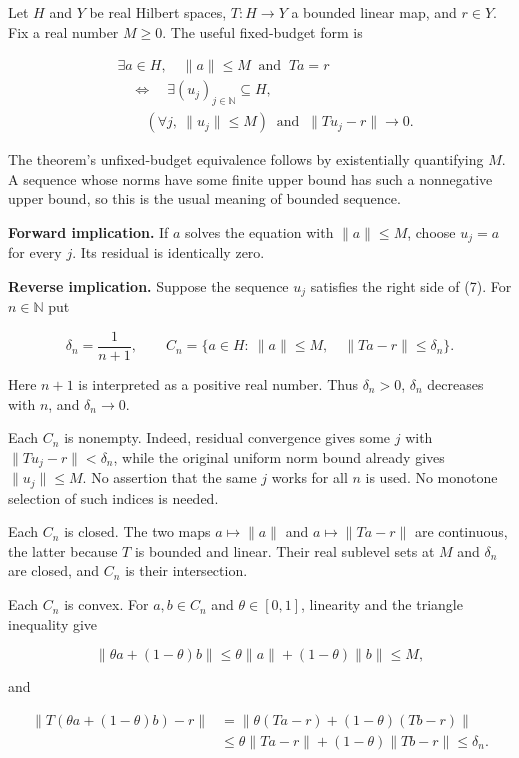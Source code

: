 \documentclass[11pt]{article}
\begin{document}
Let \(H\) and \(Y\) be real Hilbert spaces, \(T : H \to Y\) a bounded
linear map, and \(r \in Y\). Fix a real number \(M \ge 0\). The useful
fixed-budget form is

\[
\begin{aligned}
&\exists a\in H,\quad \|a\|\le M\ \text{ and }\ Ta=r\\
&\quad\Longleftrightarrow\quad
\exists (u_j)_{j\in\mathbb N}\subseteq H,\\
&\qquad
 (\forall j,\ \|u_j\|\le M)
 \ \text{ and }\ \|Tu_j-r\|\longrightarrow0.       
\end{aligned}
\tag{7}\]

The theorem's unfixed-budget equivalence follows by existentially
quantifying \(M\). A sequence whose norms have some finite upper bound
has such a nonnegative upper bound, so this is the usual meaning of
bounded sequence.

\textbf{Forward implication.} If \(a\) solves the equation with
\(\|a\| \le M\), choose \(u_j = a\) for every \(j\). Its residual is
identically zero.

\textbf{Reverse implication.} Suppose the sequence \(u_j\) satisfies the
right side of (7). For \(n \in \mathbb{N}\) put

\[
\delta_n=\frac1{n+1},\qquad
C_n=\{a\in H:\ \|a\|\le M,\quad\|Ta-r\|\le\delta_n\}. \tag{8}
\]

Here \(n+1\) is interpreted as a positive real number. Thus
\(\delta_n > 0\), \(\delta_n\) decreases with \(n\), and
\(\delta_n \to 0\).

Each \(C_n\) is nonempty. Indeed, residual convergence gives some \(j\)
with \(\|Tu_j-r\| < \delta_n\), while the original uniform norm bound
already gives \(\|u_j\| \le M\). No assertion that the same \(j\) works
for all \(n\) is used. No monotone selection of such indices is needed.

Each \(C_n\) is closed. The two maps \(a \mapsto \|a\|\) and
\(a \mapsto \|Ta-r\|\) are continuous, the latter because \(T\) is
bounded and linear. Their real sublevel sets at \(M\) and \(\delta_n\)
are closed, and \(C_n\) is their intersection.

Each \(C_n\) is convex. For \(a,b \in C_n\) and \(\theta \in [0,1]\),
linearity and the triangle inequality give

\[
\|\theta a+(1-\theta)b\|
 \le\theta\|a\|+(1-\theta)\|b\|\le M,
\]

and

\nopagebreak[4]

\[
\begin{aligned}
\|T(\theta a+(1-\theta)b)-r\|
 &=\|\theta(Ta-r)+(1-\theta)(Tb-r)\|\\
 &\le\theta\|Ta-r\|+(1-\theta)\|Tb-r\|\le\delta_n.
\end{aligned}
\]
\end{document}
